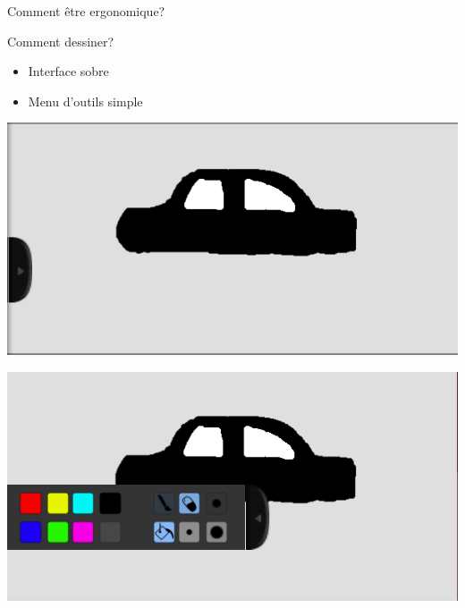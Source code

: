 \documentclass[a4paper,10pt]{beamer}
\begin{document}
		\begin{frame}{Comment être ergonomique?}

				Comment dessiner?
					\begin{itemize}
						\item Interface sobre
						\item Menu d'outils simple
					\end{itemize}
				
				\centerline{\includegraphics[scale=0.3]{images/Nono/img1.png}} \centerline{\includegraphics[scale=0.3]{images/Nono/img2.png}}
			


		\end{frame}	
		
\end{document}
